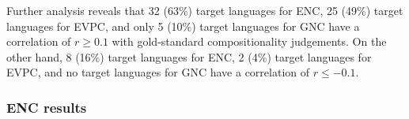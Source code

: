 \documentclass[output=paper
,modfonts
,nonflat]{langsci/langscibook}
\begin{document}



Further analysis reveals that 32 (63\%) target languages for ENC, 25
(49\%) target languages for EVPC, and only 5 (10\%) target languages for
GNC have a correlation of $r \ge 0.1$ with gold-standard
compositionality judgements. On the other hand, 8 (16\%) target
languages for ENC, 2 (4\%) target languages for EVPC, and no target
languages for GNC have a correlation of $r \le -0.1$.

\subsubsection{ENC results}
\end{document}
